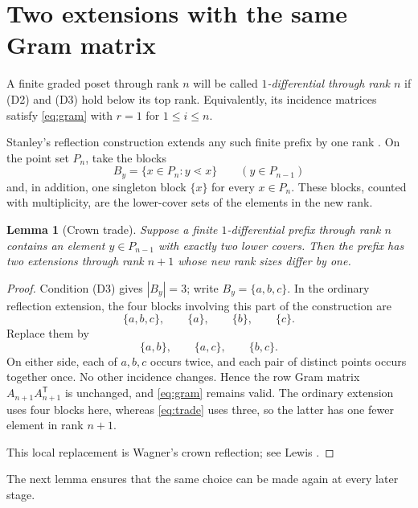 \documentclass[11pt]{amsart}
\newtheorem{lemma}[theorem]{Lemma}
\theoremstyle{remark}
\begin{document}
\section{Two extensions with the same Gram matrix}

A finite graded poset through rank $n$ will be called \emph{$1$-differential through rank $n$} if (D2) and (D3) hold below its top rank. Equivalently, its incidence matrices satisfy \eqref{eq:gram} with $r=1$ for $1\leq i\leq n$.

Stanley's reflection construction extends any such finite prefix by one rank \cite[Proposition~6.1]{Sta88}. On the point set $P_n$, take the blocks
\begin{equation}
B_y=\{x\in P_n:y\lessdot x\}
\qquad (y\in P_{n-1})
\label{eq:blocks}
\end{equation}
and, in addition, one singleton block $\{x\}$ for every $x\in P_n$. These blocks, counted with multiplicity, are the lower-cover sets of the elements in the new rank.

\begin{lemma}[Crown trade]\label{lem:crown}
Suppose a finite $1$-differential prefix through rank $n$ contains an element $y\in P_{n-1}$ with exactly two lower covers. Then the prefix has two extensions through rank $n+1$ whose new rank sizes differ by one.
\end{lemma}

\begin{proof}
Condition (D3) gives $|B_y|=3$; write $B_y=\{a,b,c\}$. In the ordinary reflection extension, the four blocks involving this part of the construction are
\[
\{a,b,c\},\qquad \{a\},\qquad \{b\},\qquad \{c\}.
\]
Replace them by
\begin{equation}
\{a,b\},\qquad \{a,c\},\qquad \{b,c\}.
\label{eq:trade}
\end{equation}
On either side, each of $a,b,c$ occurs twice, and each pair of distinct points occurs together once. No other incidence changes. Hence the row Gram matrix $A_{n+1}A_{n+1}^{\mathsf T}$ is unchanged, and \eqref{eq:gram} remains valid. The ordinary extension uses four blocks here, whereas \eqref{eq:trade} uses three, so the latter has one fewer element in rank $n+1$.

This local replacement is Wagner's crown reflection; see Lewis \cite[Theorem~3.4 and pp.~11--12]{Lew07}.
\end{proof}

The next lemma ensures that the same choice can be made again at every later stage.
\end{document}
